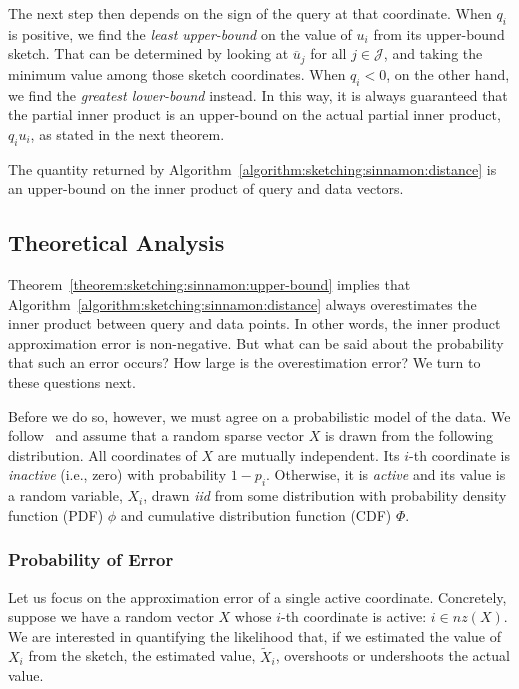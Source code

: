 \begin{svgraybox}
The next step then depends on the sign of the query at that coordinate.
When $q_i$ is positive, we find the \emph{least upper-bound} on the value of
$u_i$ from its upper-bound sketch. That can be determined by looking at $\overline{u}_j$
for all $j \in \mathcal{J}$, and taking the minimum value among those sketch coordinates.
When $q_i < 0$, on the other hand, we find the \emph{greatest lower-bound} instead.
In this way, it is always guaranteed that the partial inner product is an upper-bound on the actual
partial inner product, $q_i u_i$, as stated in the next theorem.
\end{svgraybox}

\begin{theorem}
    \label{theorem:sketching:sinnamon:upper-bound}
    The quantity returned by Algorithm~\ref{algorithm:sketching:sinnamon:distance} 
    is an upper-bound on the inner product of query and data vectors.
\end{theorem}

\subsection{Theoretical Analysis}

Theorem~\ref{theorem:sketching:sinnamon:upper-bound} implies that
Algorithm~\ref{algorithm:sketching:sinnamon:distance} always overestimates the
inner product between query and data points. In other words,
the inner product approximation error is non-negative.
But what can be said about the probability that such an error occurs?
How large is the overestimation error? We turn to these questions next.

Before we do so, however, we must agree on a probabilistic model of the data.
We follow~\citep{bruch2023sinnamon} and assume that a random sparse vector $X$
is drawn from the following distribution.
All coordinates of $X$ are mutually independent.
Its $i$-th coordinate is \emph{inactive} (i.e., zero) with probability $1 - p_i$.
Otherwise, it is \emph{active} and its value is a random variable, $X_i$,
drawn \emph{iid} from some distribution with probability density function (PDF)
$\phi$ and cumulative distribution function (CDF) $\Phi$.

\subsubsection{Probability of Error}
Let us focus on the approximation error of a single active coordinate.
Concretely, suppose we have a random vector $X$ whose $i$-th coordinate is active: $i \in \mathit{nz}(X)$.
We are interested in quantifying the likelihood that, if we estimated the value
of $X_i$ from the sketch, the estimated value, $\tilde{X}_i$, overshoots or undershoots the actual value.

